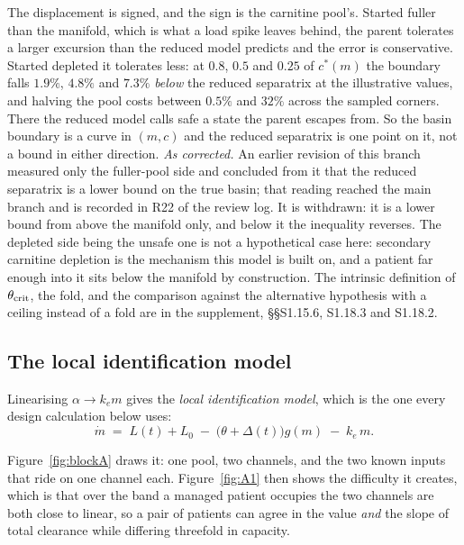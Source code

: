 The displacement is signed, and the sign is the carnitine pool's. Started fuller than the
manifold, which is what a load spike leaves behind, the parent tolerates a larger excursion
than the reduced model predicts and the error is conservative. Started depleted it tolerates
less: at $0.8$, $0.5$ and $0.25$ of $c^{\ast}(m)$ the boundary falls $1.9\%$, $4.8\%$ and
$7.3\%$ \emph{below} the reduced separatrix at the illustrative values, and halving the pool
costs between $0.5\%$ and $32\%$ across the sampled corners. There the reduced model calls
safe a state the parent escapes from. So the basin boundary is a curve in $(m,c)$ and the reduced
separatrix is one point on it, not a bound in either direction. \emph{As corrected.} An
earlier revision of this branch measured only the fuller-pool side and concluded from it
that the reduced separatrix is a lower bound on the true basin; that reading reached the
main branch and is recorded in R22 of the review log. It is withdrawn: it is a lower bound
from above the manifold only, and below it the inequality reverses. The depleted side being the
unsafe one is not a hypothetical case here: secondary carnitine depletion is the mechanism
this model is built on, and a patient far enough into it sits below the manifold by
construction. The intrinsic definition of $\theta_{\mathrm{crit}}$, the fold, and the comparison against the
alternative hypothesis with a ceiling instead of a fold are in the supplement,
\S\S S1.15.6, S1.18.3 and S1.18.2.

\subsection{The local identification model}
\label{sec:localmodel}

Linearising $\alpha \to k_e m$ gives the \emph{local identification model}, which is the one
every design calculation below uses:
\begin{equation}
\dot m \;=\; L(t) + L_0 \;-\; \bigl(\theta + \Delta(t)\bigr) g(m) \;-\; k_e\, m.
\label{eq:local}
\end{equation}

\noindent
Figure~\ref{fig:blockA} draws it: one pool, two channels, and the two known inputs that
ride on one channel each. Figure~\ref{fig:A1} then shows the difficulty it creates, which
is that over the band a managed patient occupies the two channels are both close to linear,
so a pair of patients can agree in the value \emph{and} the slope of total clearance while
differing threefold in capacity.

